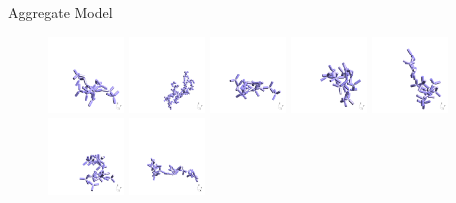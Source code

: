 \documentclass[12pt]{beamer}
\begin{document}
\begin{frame}{Aggregate Model}
\begin{figure}
    \includegraphics[width = 0.18\textwidth]{Figures/aggregates/aggregate5508.png}
    \includegraphics[width = 0.18\textwidth]{Figures/aggregates/aggregate5791.png}
    \includegraphics[width = 0.18\textwidth]{Figures/aggregates/aggregate6188.png}
    \includegraphics[width = 0.18\textwidth]{Figures/aggregates/aggregate6456.png}
    \includegraphics[width = 0.18\textwidth]{Figures/aggregates/aggregate6688.png}
    \hfill
    \includegraphics[width = 0.18\textwidth]{Figures/aggregates/aggregate6881.png}
    \includegraphics[width = 0.18\textwidth]{Figures/aggregates/aggregate7884.png}

\end{figure}
\end{frame}
\end{document}
